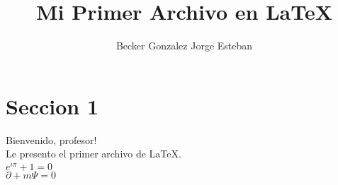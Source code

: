 \documentclass[a4paper,10pt]{article}
\title{Mi Primer Archivo en LaTeX} %
\author{Becker Gonzalez Jorge Esteban} %
\begin{document}
\maketitle

% 

\section{Seccion 1}

Bienvenido, profesor! \\ %

Le presento el primer archivo de \LaTeX.\\ %

$ e^{i \pi} + 1 = 0 $ \\ %


$ {\partial + m} \Psi = 0 $ \\
\end{document}
